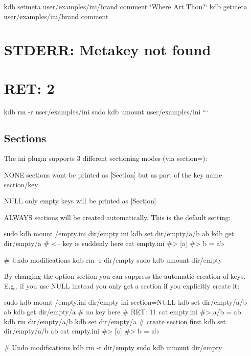 kdb setmeta user/examples/ini/brand comment \char`\"{}\+Where Art Thou?\char`\"{} kdb getmeta user/examples/ini/brand comment \section*{S\+T\+D\+E\+RR\+: Metakey not found}

\section*{R\+ET\+: 2}

kdb rm -\/r user/examples/ini sudo kdb umount user/examples/ini ```

\subsection*{Sections}

The ini plugin supports 3 different sectioning modes (via {\ttfamily section=})\+:


\begin{DoxyItemize}
\item {\ttfamily N\+O\+NE} sections wont be printed as {\ttfamily \mbox{[}Section\mbox{]}} but as part of the key name {\ttfamily section/key}
\item {\ttfamily N\+U\+LL} only empty keys will be printed as {\ttfamily \mbox{[}Section\mbox{]}}
\item {\ttfamily A\+L\+W\+A\+YS} sections will be created automatically. This is the default setting\+:
\end{DoxyItemize}


\begin{DoxyCode}
sudo kdb mount /empty.ini dir/empty ini
kdb set dir/empty/a/b ab
kdb get dir/empty/a       # <-- key is suddenly here
cat empty.ini
#> [a]
#> b = ab

# Undo modifications
kdb rm -r dir/empty
sudo kdb umount dir/empty
\end{DoxyCode}


By changing the option {\ttfamily section} you can suppress the automatic creation of keys. E.\+g., if you use {\ttfamily N\+U\+LL} instead you only get a section if you explicitly create it\+:


\begin{DoxyCode}
sudo kdb mount /empty.ini dir/empty ini section=NULL
kdb set dir/empty/a/b ab
kdb get dir/empty/a       # no key here
# RET: 11
cat empty.ini
#> a/b = ab
kdb rm dir/empty/a/b
kdb set dir/empty/a    # create section first
kdb set dir/empty/a/b ab
cat empty.ini
#> [a]
#> b = ab

# Undo modifications
kdb rm -r dir/empty
sudo kdb umount dir/empty
\end{DoxyCode}


